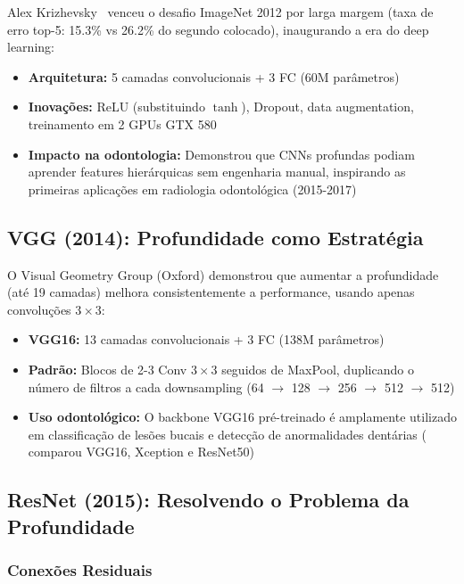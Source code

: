 Alex Krizhevsky~\cite{krizhevsky2012imagenet} venceu o desafio ImageNet 2012 por larga margem (taxa de erro
top-5: 15.3\% vs 26.2\% do segundo colocado), inaugurando a era do deep learning:

\begin{itemize}
  \item \textbf{Arquitetura:} 5 camadas convolucionais + 3 FC (60M parâmetros)
  \item \textbf{Inovações:} ReLU (substituindo $\tanh$), Dropout, data augmentation,
        treinamento em 2 GPUs GTX 580
  \item \textbf{Impacto na odontologia:} Demonstrou que CNNs profundas podiam
        aprender features hierárquicas sem engenharia manual, inspirando as
        primeiras aplicações em radiologia odontológica (2015-2017)
\end{itemize}

\subsection{VGG (2014): Profundidade como Estratégia}

O Visual Geometry Group (Oxford) demonstrou que aumentar a profundidade (até 19
camadas) melhora consistentemente a performance, usando apenas convoluções $3\times3$:

\begin{itemize}
  \item \textbf{VGG16:} 13 camadas convolucionais + 3 FC (138M parâmetros)
  \item \textbf{Padrão:} Blocos de 2-3 Conv $3\times3$ seguidos de MaxPool,
        duplicando o número de filtros a cada downsampling (64 $\to$ 128 $\to$
        256 $\to$ 512 $\to$ 512)
  \item \textbf{Uso odontológico:} O backbone VGG16 pré-treinado é amplamente
        utilizado em classificação de lesões bucais e detecção de anormalidades
        dentárias ( comparou VGG16, Xception e ResNet50)
\end{itemize}

\subsection{ResNet (2015): Resolvendo o Problema da Profundidade}

\subsubsection{Conexões Residuais}

